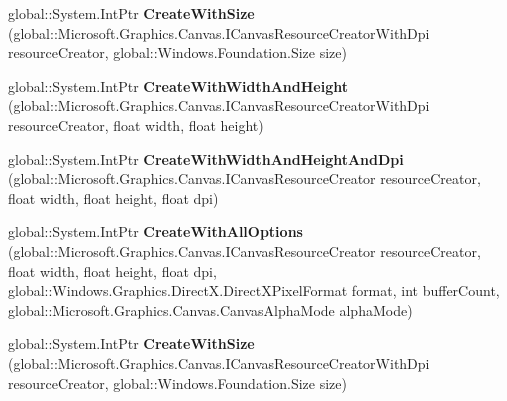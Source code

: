 \begin{DoxyCompactItemize}
\mbox{\label{interface_microsoft_1_1_graphics_1_1_canvas_1_1_i_canvas_swap_chain_factory_a80f024e2b5c57fefb1507afbe4bd54cc}} 
global\+::\+System.\+Int\+Ptr {\bfseries Create\+With\+Size} (global\+::\+Microsoft.\+Graphics.\+Canvas.\+I\+Canvas\+Resource\+Creator\+With\+Dpi resource\+Creator, global\+::\+Windows.\+Foundation.\+Size size)
\item 
\mbox{\label{interface_microsoft_1_1_graphics_1_1_canvas_1_1_i_canvas_swap_chain_factory_a2adbd2e8ccc7fda2470b0e91e8d58ca7}} 
global\+::\+System.\+Int\+Ptr {\bfseries Create\+With\+Width\+And\+Height} (global\+::\+Microsoft.\+Graphics.\+Canvas.\+I\+Canvas\+Resource\+Creator\+With\+Dpi resource\+Creator, float width, float height)
\item 
\mbox{\label{interface_microsoft_1_1_graphics_1_1_canvas_1_1_i_canvas_swap_chain_factory_abec837948f196cc09791ba957885b690}} 
global\+::\+System.\+Int\+Ptr {\bfseries Create\+With\+Width\+And\+Height\+And\+Dpi} (global\+::\+Microsoft.\+Graphics.\+Canvas.\+I\+Canvas\+Resource\+Creator resource\+Creator, float width, float height, float dpi)
\item 
\mbox{\label{interface_microsoft_1_1_graphics_1_1_canvas_1_1_i_canvas_swap_chain_factory_ab3ef9c019b3b37be03ba50236075ba58}} 
global\+::\+System.\+Int\+Ptr {\bfseries Create\+With\+All\+Options} (global\+::\+Microsoft.\+Graphics.\+Canvas.\+I\+Canvas\+Resource\+Creator resource\+Creator, float width, float height, float dpi, global\+::\+Windows.\+Graphics.\+Direct\+X.\+Direct\+X\+Pixel\+Format format, int buffer\+Count, global\+::\+Microsoft.\+Graphics.\+Canvas.\+Canvas\+Alpha\+Mode alpha\+Mode)
\item 
\mbox{\label{interface_microsoft_1_1_graphics_1_1_canvas_1_1_i_canvas_swap_chain_factory_a80f024e2b5c57fefb1507afbe4bd54cc}} 
global\+::\+System.\+Int\+Ptr {\bfseries Create\+With\+Size} (global\+::\+Microsoft.\+Graphics.\+Canvas.\+I\+Canvas\+Resource\+Creator\+With\+Dpi resource\+Creator, global\+::\+Windows.\+Foundation.\+Size size)

\end{DoxyCompactItemize}
